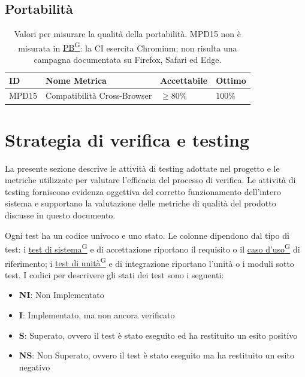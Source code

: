 \documentclass[a4paper,12pt]{article}
\providecommand{\glslink}[2]{\href{https://alittlebyte-19.github.io/Documentazione/glossario.html\#gls-#1}{\underline{#2}\textsuperscript{\scriptsize G}}}
\begin{document}
\subsection{Portabilità}
\begin{table}[H]
    \centering
    \renewcommand{\arraystretch}{1.2}
    \begin{tabularx}{\textwidth}{|p{2.4cm}|X|p{3cm}|p{3cm}|}
        \hline
        \rowcolor{gray!20}
        \textbf{ID} & \textbf{Nome Metrica} & \textbf{Accettabile} & \textbf{Ottimo} \\
        \hline
        MPD15 & Compatibilità Cross-Browser & $\geq 80\%$ & $100\%$ \\
        \hline
    \end{tabularx}
    \caption{Valori per misurare la qualità della portabilità. MPD15 non è misurata in \glslink{pb-product-baseline}{PB}: la CI esercita Chromium; non risulta una campagna documentata su Firefox, Safari ed Edge.}
\end{table}

\section{Strategia di verifica e testing}
\label{sec:strategia-testing}
La presente sezione descrive le attività di testing adottate nel progetto e le metriche utilizzate per valutare l'efficacia del processo di verifica.
Le attività di testing forniscono evidenza oggettiva del corretto funzionamento dell'intero sistema e supportano la valutazione delle metriche di qualità del prodotto discusse in questo documento.

Ogni test ha un codice univoco e uno stato. Le colonne dipendono dal tipo di test: i \glslink{test-di-sistema}{test di sistema} e di accettazione riportano il requisito o il \glslink{caso-d-uso-uc}{caso d'uso} di riferimento; i \glslink{test-di-unita}{test di unità} e di integrazione riportano l'unità o i moduli sotto test. I codici per descrivere gli stati dei test sono i seguenti:
\begin{itemize}
    \item \textbf{NI}: Non Implementato
    \item \textbf{I}: Implementato, ma non ancora verificato
    \item \textbf{S}: Superato, ovvero il test è stato eseguito ed ha restituito un esito positivo
    \item \textbf{NS}: Non Superato, ovvero il test è stato eseguito ma ha restituito un esito negativo
\end{itemize}
\end{document}
